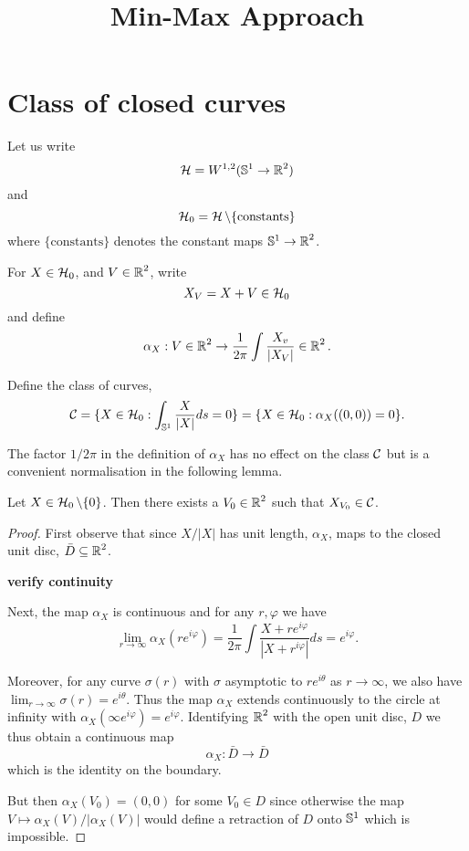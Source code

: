 \documentclass[12pt]{article}
\title{Min-Max Approach}
\date{}
\begin{document}
\maketitle

\section{Class of closed curves}
\label{sec-1}

Let us write
\[
\operatorname{\mathcal{H}} = W^{1,2}(\operatorname{\mathbb{S}^1} \to \operatorname{\mathbb{R}}^2)
\]
and
\[
\operatorname{\operatorname{\mathcal{H}}_0} = \operatorname{\mathcal{H}} \operatorname{\backslash} \lbrace \text{constants} \rbrace
\]
where \(\lbrace \text{constants} \rbrace\) denotes the constant maps \(\operatorname{\mathbb{S}^1} \to \operatorname{\mathbb{R}}^2\).

For \(X \in \operatorname{\operatorname{\mathcal{H}}_0}\), and \(V \in \operatorname{\mathbb{R}}^2\), write
\[
X_V = X + V \in \operatorname{\operatorname{\mathcal{H}}_0}
\]
and define
\[
\alpha_X : V \in \operatorname{\mathbb{R}}^2 \to \frac{1}{2\pi} \int \frac{X_v}{|X_V|} \in \operatorname{\mathbb{R}}^2.
\]

Define the class of curves,
\[
\operatorname{\mathcal{C}} = \lbrace X \in \operatorname{\operatorname{\mathcal{H}}_0} : \int_{\operatorname{\mathbb{S}^1}} \frac{X}{|X|} ds = 0 \rbrace = \lbrace X \in \operatorname{\operatorname{\mathcal{H}}_0} : \alpha_X((0, 0)) = 0 \rbrace.
\]

The factor \(1/2\pi\) in the definition of \(\alpha_X\) has no effect on the class \(\operatorname{\mathcal{C}}\) but is a convenient normalisation in the following lemma.

\begin{lemma}
\label{lem:translate_C}
Let \(X \in \operatorname{\operatorname{\mathcal{H}}_0} \backslash \lbrace 0 \rbrace\). Then there exists a \(V_0 \in \operatorname{\mathbb{R}}^2\) such that \(X_{V_0} \in \operatorname{\mathcal{C}}\).
\end{lemma}

\begin{proof}
First observe that since \(X/|X|\) has unit length, \(\alpha_X\), maps to the closed unit disc, \(\bar{D} \subseteq \operatorname{\mathbb{R}}^2\).

\textbf{verify continuity}

Next, the map \(\alpha_X\) is continuous and for any \(r, \varphi\) we have
\[
\lim_{r \to \infty} \alpha_X (r e^{i\varphi}) = \frac{1}{2\pi} \int \frac{X + re^{i\varphi}}{|X + r^{i\varphi}|} ds = e^{i\varphi}.
\]

Moreover, for any curve \(\sigma(r)\) with \(\sigma\) asymptotic to \(r e^{i\theta}\) as \(r \to \infty\), we also have \(\lim_{r\to\infty} \sigma(r) = e^{i\theta}\). Thus the map \(\alpha_X\) extends continuously to the circle at infinity with \(\alpha_X(\infty e^{i\varphi}) = e^{i\varphi}\). Identifying \(\operatorname{\mathbb{R}}^2\) with the open unit disc, \(D\) we thus obtain a continuous map
\[
\alpha_X : \bar{D} \to \bar{D}
\]
which is the identity on the boundary.

But then \(\alpha_X(V_0) = (0, 0)\) for some \(V_0 \in D\) since otherwise the map \(V \mapsto \alpha_X(V)/|\alpha_X(V)|\) would define a retraction of \(D\) onto \(\operatorname{\mathbb{S}^1}\) which is impossible.
\end{proof}
\end{document}

